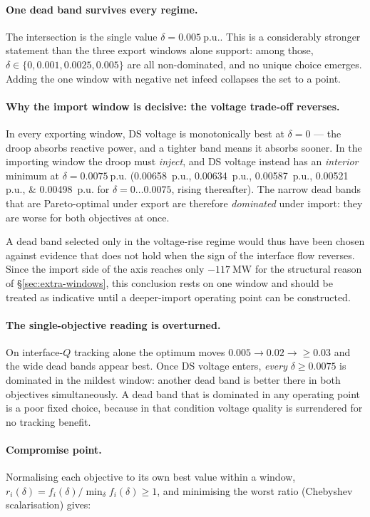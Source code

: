 \documentclass[11pt,a4paper]{article}
\newcommand{\pu}{\ensuremath{\mathrm{p.u.}}}
\newcommand{\dz}{\ensuremath{\delta}}
\begin{document}
\paragraph{One dead band survives every regime.} The intersection is the single
value $\dz = \SI{0.005}{\pu}$. This is a considerably stronger statement than
the three export windows alone support: among those, $\dz \in \{0, 0.001,
0.0025, 0.005\}$ are all non-dominated, and no unique choice emerges. Adding the
one window with negative net infeed collapses the set to a point.

\paragraph{Why the import window is decisive: the voltage trade-off reverses.}
In every exporting window, DS voltage is monotonically best at $\dz = 0$ ---
the droop absorbs reactive power, and a tighter band means it absorbs sooner. In
the importing window the droop must \emph{inject}, and DS voltage instead has an
\emph{interior} minimum at $\dz = \SI{0.0075}{\pu}$
(\SIlist{0.00658;0.00634;0.00587;0.00521;0.00498}{\pu} for
$\dz = 0 \dots 0.0075$, rising thereafter). The narrow dead bands that are
Pareto-optimal under export are therefore \emph{dominated} under import: they
are worse for both objectives at once.

A dead band selected only in the voltage-rise regime would thus have been chosen
against evidence that does not hold when the sign of the interface flow
reverses. Since the import side of the axis reaches only
$-\SI{117}{\mega\watt}$ for the structural reason of
\S\ref{sec:extra-windows}, this conclusion rests on one window and should be
treated as indicative until a deeper-import operating point can be constructed.

\paragraph{The single-objective reading is overturned.} On interface-$Q$
tracking alone the optimum moves $0.005 \rightarrow 0.02 \rightarrow \geq 0.03$
and the wide dead bands appear best. Once DS voltage enters, \emph{every}
$\dz \geq 0.0075$ is dominated in the mildest window: another dead band is
better there in both objectives simultaneously. A dead band that is dominated
in any operating point is a poor fixed choice, because in that condition
voltage quality is surrendered for no tracking benefit.

\paragraph{Compromise point.} Normalising each objective to its own best value
within a window, $r_i(\dz) = f_i(\dz)/\min_\dz f_i(\dz) \geq 1$, and minimising
the worst ratio (Chebyshev scalarisation) gives:
\end{document}
